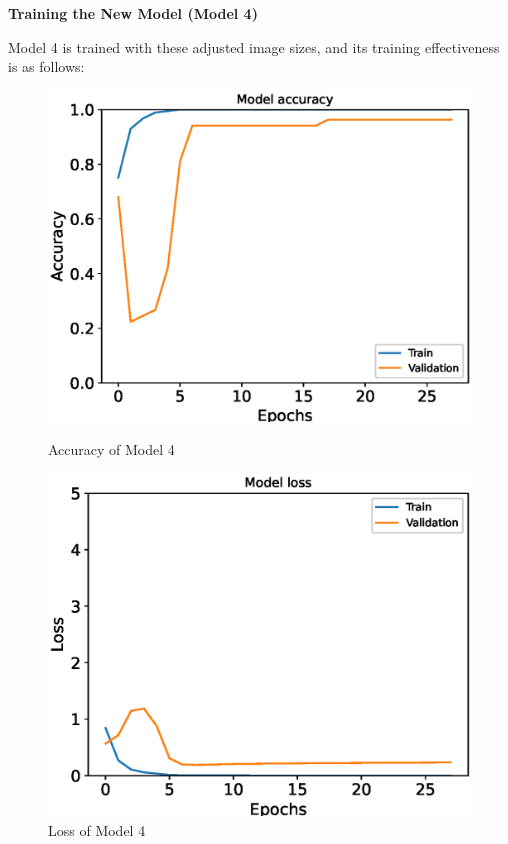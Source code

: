 \textbf{Training the New Model (Model 4)}

Model 4 is trained with these adjusted image sizes, and its training effectiveness is as follows:

\begin{figure}[H]
    \centering
    \begin{minipage}{0.45\textwidth}
        \centering
        \includegraphics[width=\textwidth]{./fig/model4/accuracy4.eps}
        \caption{Accuracy of Model 4}
        \label{fig:model4_accuracy}
    \end{minipage}
    \begin{minipage}{0.45\textwidth}
        \centering
        \includegraphics[width=\textwidth]{./fig/model4/loss4.eps}
        \caption{Loss of Model 4}
        \label{fig:model4_loss}
    \end{minipage}
\end{figure}

